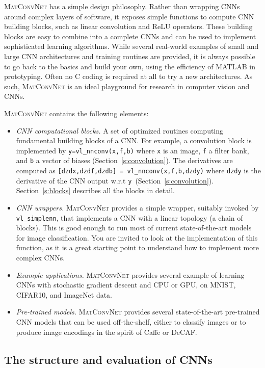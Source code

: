 \documentclass[12pt]{article}
\newcommand{\vlnn}{\textsc{MatConvNet}\xspace}
\begin{document}
\vlnn has a simple design philosophy. Rather than wrapping CNNs around complex layers of software, it exposes simple functions to compute CNN building blocks, such as linear convolution and ReLU operators. These building blocks are easy to combine into a complete CNNs and can be used to implement sophisticated learning algorithms. While several real-world examples of small and large CNN architectures and training routines are provided, it is always possible to go back to the basics and build your own, using the efficiency of MATLAB in prototyping. Often no C coding is required at all to try a new architectures. As such, \vlnn is an ideal playground for research in computer vision and CNNs.

\vlnn contains the following elements:
\begin{itemize}
\item \emph{CNN computational blocks.} A set of optimized routines computing fundamental building blocks of a CNN. For example, a convolution block is implemented by \linebreak \verb!y=vl_nnconv(x,f,b)! where \verb!x! is an image, \verb!f! a filter bank, and \verb!b! a vector of biases (Section~\ref{s:convolution}). The derivatives are computed as
\verb![dzdx,dzdf,dzdb] = vl_nnconv(x,f,b,dzdy)! where \verb!dzdy! is the derivative of the CNN output w.r.t \verb!y!~(Section~\ref{s:convolution}). Section~\ref{s:blocks} describes all the blocks in detail.
\item \emph{CNN wrappers.} \vlnn provides a simple wrapper, suitably invoked by \verb!vl_simplenn!, that implements a CNN with a linear topology (a chain of blocks). This is good enough to run most of current state-of-the-art models for image classification. You are invited to look at the implementation of this function, as it is a great starting point to understand how to implement more complex CNNs.
\item \emph{Example applications.} \vlnn provides several example of learning CNNs with stochastic gradient descent and CPU or GPU, on MNIST, CIFAR10, and ImageNet data.
\item \emph{Pre-trained models.} \vlnn provides several state-of-the-art pre-trained CNN models that can be used off-the-shelf, either to classify images or to produce image encodings in the spirit of Caffe or DeCAF.
\end{itemize}

\subsection{The structure and evaluation of CNNs}\label{s:forward}
\end{document}
